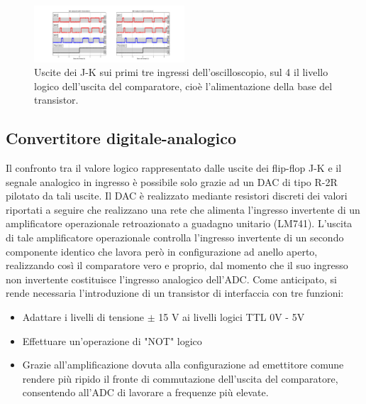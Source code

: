 \documentclass[journal]{IEEEtran}
\begin{document}
\begin{figure}[H]%
\begin{center}
\includegraphics[trim = {570 0 0 0}, clip, width=0.50\textwidth]{analysis/output/cumulative_BIT_with_transistor.pdf}
\caption{Uscite dei J-K sui primi tre ingressi dell'oscilloscopio, sul 4 il livello logico dell'uscita del comparatore, cioè l'alimentazione della base del transistor.}
\label{fig:Comparator-output}
\end{center}
\end{figure}

\subsection{Convertitore digitale-analogico}
Il confronto tra il valore logico rappresentato dalle uscite dei flip-flop J-K e il segnale analogico in ingresso è possibile solo grazie ad un DAC di tipo R-2R pilotato da tali uscite. Il DAC è realizzato mediante resistori discreti dei valori riportati a seguire che realizzano una rete che alimenta l'ingresso invertente di un amplificatore operazionale retroazionato a guadagno unitario (LM741). L'uscita di tale amplificatore operazionale controlla l'ingresso invertente di un secondo componente identico che lavora però in configurazione ad anello aperto, realizzando così il comparatore vero e proprio, dal momento che il suo ingresso non invertente costituisce l'ingresso analogico dell'ADC. Come anticipato, si rende necessaria l'introduzione di un transistor di interfaccia con tre funzioni:
\begin{itemize}
    \item Adattare i livelli di tensione $\pm$ 15 V ai livelli logici TTL 0V - 5V
    \item Effettuare un'operazione di "NOT" logico
    \item Grazie all'amplificazione dovuta alla configurazione ad emettitore comune rendere più ripido il fronte di commutazione dell'uscita del comparatore, consentendo all'ADC di lavorare a frequenze più elevate.
\end{itemize}
\end{document}
